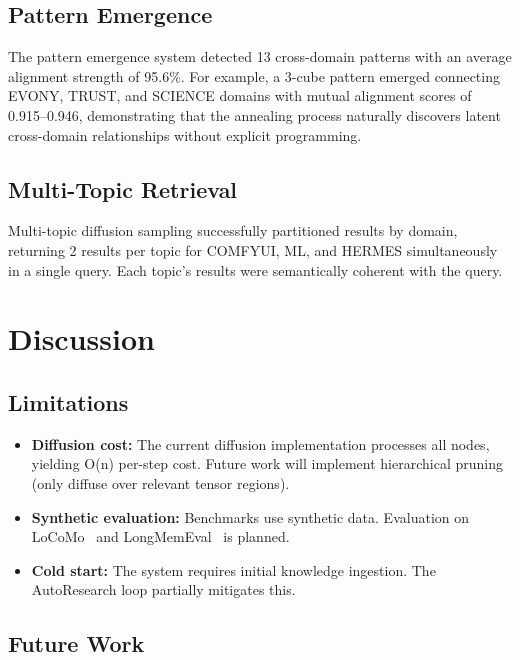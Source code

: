 \documentclass[11pt,a4paper]{article}
\begin{document}
\subsection{Pattern Emergence}

The pattern emergence system detected 13 cross-domain patterns with an average alignment strength of 95.6\%. For example, a 3-cube pattern emerged connecting EVONY, TRUST, and SCIENCE domains with mutual alignment scores of 0.915--0.946, demonstrating that the annealing process naturally discovers latent cross-domain relationships without explicit programming.

\subsection{Multi-Topic Retrieval}

Multi-topic diffusion sampling successfully partitioned results by domain, returning 2 results per topic for COMFYUI, ML, and HERMES simultaneously in a single query. Each topic's results were semantically coherent with the query.

\section{Discussion}

\subsection{Limitations}

\begin{itemize}[leftmargin=*,itemsep=0pt]
    \item \textbf{Diffusion cost:} The current diffusion implementation processes all nodes, yielding O(n) per-step cost. Future work will implement hierarchical pruning (only diffuse over relevant tensor regions).
    \item \textbf{Synthetic evaluation:} Benchmarks use synthetic data. Evaluation on LoCoMo~\cite{maharana2024locomo} and LongMemEval~\cite{wu2025longmem} is planned.
    \item \textbf{Cold start:} The system requires initial knowledge ingestion. The AutoResearch loop partially mitigates this.
\end{itemize}

\subsection{Future Work}
\end{document}
